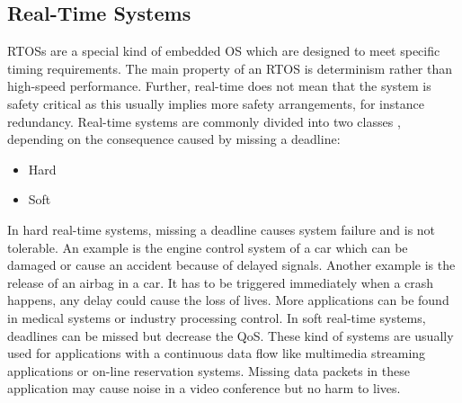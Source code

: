 \subsection{Real-Time Systems}
\acp{RTOS} are a special kind of embedded \ac{OS} which are designed to meet specific timing requirements. 
The main property of an \ac{RTOS} is determinism rather than high-speed performance.  
Further, real-time does not mean that the system is safety critical as this usually implies more safety arrangements, for instance redundancy.
Real-time systems are commonly divided into two classes \cite{stromblad:elfrtoemd}, depending on the consequence caused by missing a deadline:
\begin{itemize}
	\item Hard
	\item Soft
\end{itemize}
In hard real-time systems, missing a deadline causes system failure and is not tolerable.  
An example is the engine control system of a car which can be damaged or cause an accident because of delayed signals.
Another example is the release of an airbag in a car. 
It has to be triggered immediately when a crash happens, any delay could cause the loss of lives. 
More applications can be found in medical systems or industry processing control.  
In soft real-time systems, deadlines can be missed but decrease the \ac{QoS}. 
These kind of systems are usually used for applications with a continuous data flow like multimedia streaming applications or on-line reservation systems.
Missing data packets in these application may cause noise in a video conference but no harm to lives.

